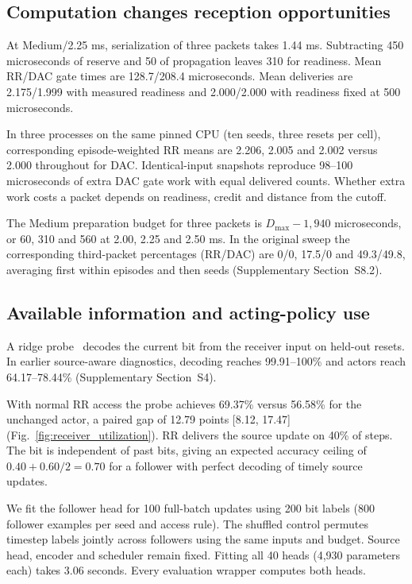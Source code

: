 \documentclass[pdflatex,sn-mathphys-num]{sn-jnl}
\begin{document}
\subsection{Computation changes reception opportunities}\label{sec:timing}
At Medium/2.25 ms, serialization of three packets takes 1.44 ms. Subtracting 450 microseconds of reserve and 50 of propagation leaves 310 for readiness. Mean RR/DAC gate times are 128.7/208.4 microseconds. Mean deliveries are 2.175/1.999 with measured readiness and 2.000/2.000 with readiness fixed at 500 microseconds.

In three processes on the same pinned CPU (ten seeds, three resets per cell), corresponding episode-weighted RR means are 2.206, 2.005 and 2.002 versus 2.000 throughout for DAC. Identical-input snapshots reproduce 98--100 microseconds of extra DAC gate work with equal delivered counts. Whether extra work costs a packet depends on readiness, credit and distance from the cutoff.

The Medium preparation budget for three packets is $D_{\max}-1{,}940$ microseconds, or 60, 310 and 560 at 2.00, 2.25 and 2.50 ms. In the original sweep the corresponding third-packet percentages (RR/DAC) are 0/0, 17.5/0 and 49.3/49.8, averaging first within episodes and then seeds (Supplementary Section~S8.2).


\subsection{Available information and acting-policy use}\label{sec:receiver_decision}
A ridge probe~\citep{alain2016understanding,hoerl1970ridge} decodes the current bit from the receiver input on held-out resets. In earlier source-aware diagnostics, decoding reaches 99.91--100\% and actors reach 64.17--78.44\% (Supplementary Section~S4).

With normal RR access the probe achieves 69.37\% versus 56.58\% for the unchanged actor, a paired gap of 12.79 points [8.12, 17.47] (Fig.~\ref{fig:receiver_utilization}). RR delivers the source update on 40\% of steps. The bit is independent of past bits, giving an expected accuracy ceiling of $0.40+0.60/2=0.70$ for a follower with perfect decoding of timely source updates.

We fit the follower head for 100 full-batch updates using 200 bit labels (800 follower examples per seed and access rule). The shuffled control permutes timestep labels jointly across followers using the same inputs and budget. Source head, encoder and scheduler remain fixed. Fitting all 40 heads (4,930 parameters each) takes 3.06 seconds. Every evaluation wrapper computes both heads.
\end{document}
